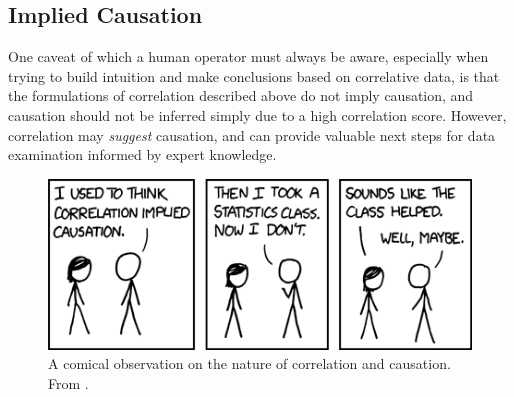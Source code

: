 \subsection{Implied Causation}

One caveat of which a human operator must always be aware, especially when trying to build intuition and make conclusions based on correlative data, is that the formulations of correlation described above do not imply causation, and causation should not be inferred simply due to a high correlation score. However, correlation may \textit{suggest} causation, and can provide valuable next steps for data examination informed by expert knowledge.

\begin{figure}[h]
\centering
    \includegraphics[width=0.5\columnwidth]{images/xkcd_correlation.png}
    \caption{A comical observation on the nature of correlation and causation. From \cite{xkcd_correlation}.}
    \label{fig:xkcd_correction}
\end{figure}







